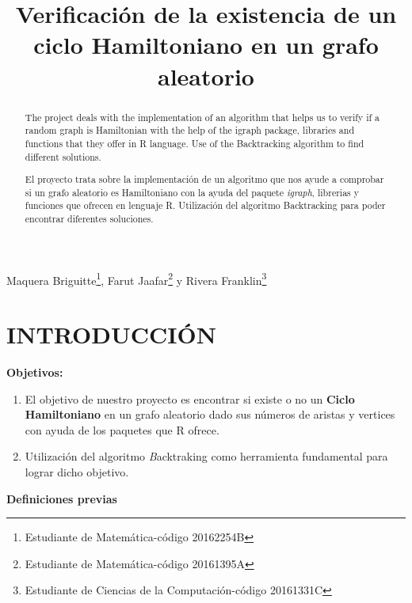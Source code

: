 \documentclass[journal]{IEEEtran}
\title{\LARGE \bf
		Verificación de la existencia de un ciclo Hamiltoniano en un grafo aleatorio}
\begin{document}
\maketitle
{Maquera Briguitte\footnote{Estudiante de Matemática-código 20162254B}, Farut Jaafar\footnote{Estudiante de Matemática-código 	20161395A} y Rivera Franklin\footnote{Estudiante de Ciencias de la Computación-código 20161331C}}
\vspace{10mm}
\thispagestyle{empty}

\pagestyle{empty}


\begin{abstract}
	
	The project deals with the implementation of an algorithm that helps us to verify if a random graph is Hamiltonian with the help of the igraph package, libraries and functions that they offer in R language. Use of the Backtracking algorithm to find different solutions.
\end{abstract}

\begin{abstract}
	
	El proyecto trata sobre la implementación de un algoritmo que nos ayude a comprobar si un grafo aleatorio es Hamiltoniano  con la ayuda del paquete \textit{igraph}, librerias y funciones que ofrecen en lenguaje R. Utilización del algoritmo Backtracking para poder encontrar diferentes soluciones.

\end{abstract}

	
\section{\large\bf INTRODUCCI{\'O}N}
 
 {\bf Objetivos:}\\
 \begin{enumerate}
 	\item El objetivo de nuestro proyecto es encontrar si existe o no un {\bf Ciclo Hamiltoniano} en un grafo aleatorio dado sus números de aristas y vertices con ayuda de los paquetes que R ofrece.
 	\item Utilización del algoritmo {\textit Backtraking} como herramienta fundamental para lograr dicho objetivo.
 \end{enumerate}
\vspace{0.2mm}
{\bf Definiciones previas}\\
\vspace{0.2mm}
\end{document}
